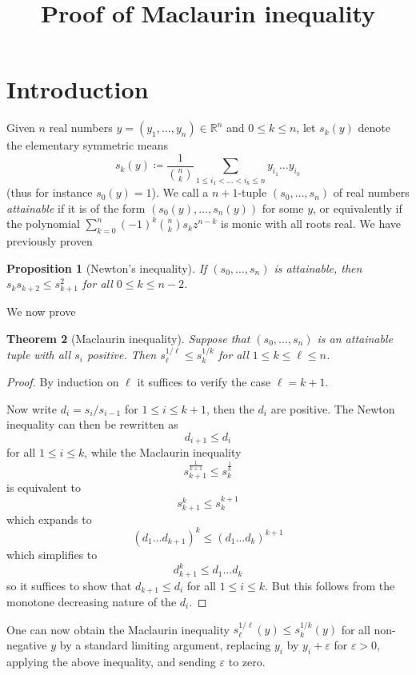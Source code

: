 \documentclass[12pt,a4paper,reqno]{amsart}
\numberwithin{equation}{section}
\theoremstyle{plain}
\newtheorem{theorem}{Theorem}[section]
\newtheorem{proposition}[theorem]{Proposition}
\theoremstyle{definition}
\newcommand\R{\mathbb{R}}
\newcommand\eps{\varepsilon}
\begin{document}
\title{Proof of Maclaurin inequality}

\author{} %
\address{}%
\email{}%



\maketitle


\section{Introduction}

Given $n$ real numbers $y = (y_1,\dots,y_n) \in \R^n$ and $0 \leq k \leq n$, let $s_k(y)$ denote the elementary symmetric means
$$ s_k(y) \coloneqq \frac{1}{\binom{n}{k}} \sum_{1 \leq i_1 < \dots < i_k \leq n} y_{i_1} \dots y_{i_k}$$
(thus for instance $s_0(y)=1$).  
We call a $n+1$-tuple $(s_0,\dots,s_n)$ of real numbers \emph{attainable} if it is of the form $(s_0(y),\dots,s_n(y))$ for some $y$, or equivalently if the polynomial $\sum_{k=0}^n (-1)^k \binom{n}{k} s_k z^{n-k}$ is monic with all roots real.  We have previously proven



\begin{proposition}[Newton's inequality]\label{prop-newton} If $(s_0,\dots,s_n)$ is attainable, then $s_k s_{k+2} \leq s_{k+1}^2$ for all $0 \leq k \leq n-2$.
\end{proposition}

We now prove

\begin{theorem}[Maclaurin inequality]\label{thm-maclaurin}  Suppose that $(s_0,\dots,s_n)$ is an attainable tuple with all $s_i$ positive.  Then $s_\ell^{1/\ell} \leq s_k^{1/k}$ for all $1 \leq k \leq \ell \leq n$.
\end{theorem}

\begin{proof}  By induction on $\ell$ it suffices to verify the case $\ell=k+1$.

Now write $d_i = s_i / s_{i-1}$ for $1 \leq i \leq k+1$, then the $d_i$ are positive.  The Newton inequality can then be rewritten as
$$ d_{i+1} \leq d_i$$
for all $1 \leq i \leq k$, while the Maclaurin inequality
$$ s_{k+1}^{\frac{1}{k+1}} \leq s_k^{\frac{1}{k}}$$
is equivalent to
$$ s_{k+1}^k \leq s_k^{k+1}$$
which expands to
$$ (d_1 \dots d_{k+1})^k \leq (d_1 \dots d_k)^{k+1}$$
which simplifies to
$$ d_{k+1}^k \leq d_1 \dots d_k$$
so it suffices to show that $d_{k+1} \leq d_i$ for all $1 \leq i \leq k$.  But this follows from the monotone decreasing nature of the $d_i$.
\end{proof}

One can now obtain the Maclaurin inequality
$s_\ell^{1/\ell}(y) \leq s_k^{1/k}(y)$ for all non-negative $y$ by a standard limiting argument, replacing $y_i$ by $y_i+\eps$ for $\eps>0$, applying the above inequality, and sending $\eps$ to zero.
\end{document}
